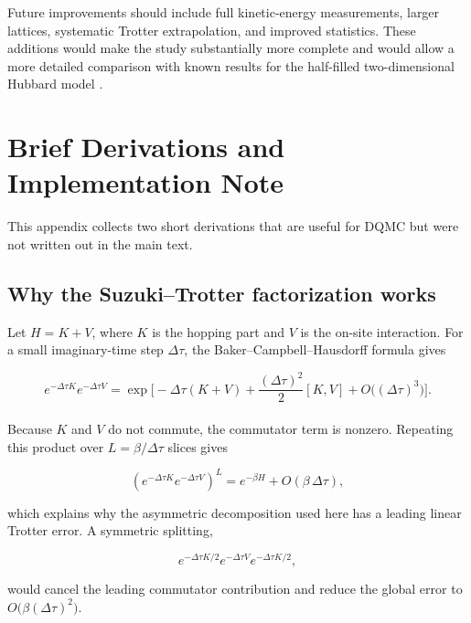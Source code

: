 \documentclass[9pt,a4paper,twocolumn,twoside]{rho-class/rho}
\begin{document}
Future improvements should include full kinetic-energy measurements, larger lattices, systematic Trotter extrapolation, and improved statistics. These additions would make the study substantially more complete and would allow a more detailed comparison with known results for the half-filled two-dimensional Hubbard model \cite{Yao2018DQMC,white1989}.

\appendix
\section{Brief Derivations and Implementation Note}

This appendix collects two short derivations that are useful for DQMC but were not written out in the main text.

\subsection{Why the Suzuki--Trotter factorization works}

Let $H=K+V$, where $K$ is the hopping part and $V$ is the on-site interaction. For a small imaginary-time step $\Delta\tau$, the Baker--Campbell--Hausdorff formula gives

\begin{equation}
e^{-\Delta\tau K}e^{-\Delta\tau V}
=
\exp\!\bigg[-\Delta\tau(K+V)+\frac{(\Delta\tau)^2}{2}[K,V]+O\!\big((\Delta\tau)^3\big)\bigg].
\end{equation}
\\
Because $K$ and $V$ do not commute, the commutator term is nonzero. Repeating this product over $L=\beta/\Delta\tau$ slices gives

\begin{equation}
\left(e^{-\Delta\tau K}e^{-\Delta\tau V}\right)^L
=
e^{-\beta H}+O(\beta\,\Delta\tau),
\end{equation}

which explains why the asymmetric decomposition used here has a leading linear Trotter error. A symmetric splitting,

\begin{equation}
e^{-\Delta\tau K/2}e^{-\Delta\tau V}e^{-\Delta\tau K/2},
\end{equation}

would cancel the leading commutator contribution and reduce the global error to $O\big(\beta(\Delta\tau)^2\big)$.
\end{document}
